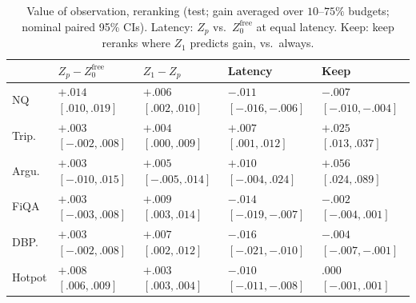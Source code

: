 \documentclass[sigconf,anonymous,review]{acmart}
\begin{document}
\begin{table}[t]
\caption{Value of observation, reranking (test; gain averaged over
$10$--$75\%$ budgets; nominal paired 95\% CIs). Latency: $Z_p$ vs.\
$Z_0^{\text{free}}$ at equal latency. Keep: keep reranks where $Z_1$
predicts gain, vs.\ always.}
\label{tab:obs}
\scriptsize
\setlength{\tabcolsep}{1pt}
\begin{tabular}{@{}lllll@{}}
\toprule
 & $Z_p-Z_0^{\text{free}}$ & $Z_1-Z_p$ & Latency & Keep \\
\midrule
NQ & $+.014$\,$[.010,.019]$ & $+.006$\,$[.002,.010]$ & $-.011$\,$[-.016,-.006]$ & $-.007$\,$[-.010,-.004]$ \\
Trip. & $+.003$\,$[-.002,.008]$ & $+.004$\,$[.000,.009]$ & $+.007$\,$[.001,.012]$ & $+.025$\,$[.013,.037]$ \\
Argu. & $+.003$\,$[-.010,.015]$ & $+.005$\,$[-.005,.014]$ & $+.010$\,$[-.004,.024]$ & $+.056$\,$[.024,.089]$ \\
FiQA & $+.003$\,$[-.003,.008]$ & $+.009$\,$[.003,.014]$ & $-.014$\,$[-.019,-.007]$ & $-.002$\,$[-.004,.001]$ \\
DBP. & $+.003$\,$[-.002,.008]$ & $+.007$\,$[.002,.012]$ & $-.016$\,$[-.021,-.010]$ & $-.004$\,$[-.007,-.001]$ \\
Hotpot & $+.008$\,$[.006,.009]$ & $+.003$\,$[.003,.004]$ & $-.010$\,$[-.011,-.008]$ & $.000$\,$[-.001,.001]$ \\
\bottomrule
\end{tabular}
\end{table}
\end{document}
